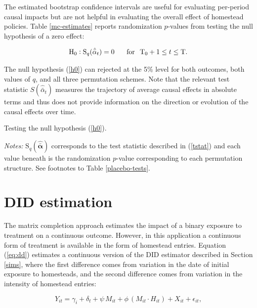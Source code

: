 \documentclass[hidelinks,12pt]{article}
\begin{document}
The estimated bootstrap confidence intervals are useful for evaluating per-period causal impacts but are not helpful in evaluating the overall effect of homestead policies. Table \ref{mc-estimates} reports randomization $p$-values from testing the null hypothesis of a zero effect:

\begin{equation} \label{h0}
\text{H}_0: \text{S}_q (\hat{\bar{\alpha}}_{t}) = 0  \, \hspace{5mm} \,  \text{for} \, \hspace{2mm}  \text{T}_0 + 1 \leq t \leq \text{T}.
\end{equation}
\noindent

The null hypothesis (\ref{h0}) can rejected at the 5\% level for both outcomes, both values of $q$, and all three permutation schemes. Note that the relevant test statistic $S (\hat{\bar{\alpha}}_{t})$ measures the trajectory of average causal effects in absolute terms and thus does not provide information on the direction or evolution of the causal effects over time.

\begin{table}[htbp]
	\captionsetup{font=normalsize}
	\caption{Testing the null hypothesis (\ref{h0}).\label{mc-estimates}}
	\begin{center}
		
	\end{center}
	\footnotesize{\emph{Notes:} $\text{S}_q (\boldsymbol{\hat{\bar{\alpha}}})$ corresponds to the test statistic described in (\ref{tstat}) and each value beneath is the randomization $p$-value corresponding to each permutation structure. See footnotes to Table \ref{placebo-tests}.}
\end{table}

\section{DID estimation} \label{DID}

The matrix completion approach estimates the impact of a binary exposure to treatment on a continuous outcome. However, in this application a continuous form of treatment is available in the form of homestead entries. Equation (\ref{eq:dd}) estimates a continuous version of the DID estimator described in Section \ref{sims}, where the first difference comes from variation in the date of initial exposure to homesteads, and the second difference comes from variation in the intensity of homestead entries:

\begin{equation} 
Y_{it} =  \gamma_i + \delta_t + \psi \, M_{it} + \phi \, (M_{it} \cdot H_{it}) + X_{it}  + \epsilon_{it}, \label{eq:dd} 
\end{equation}
\end{document}
